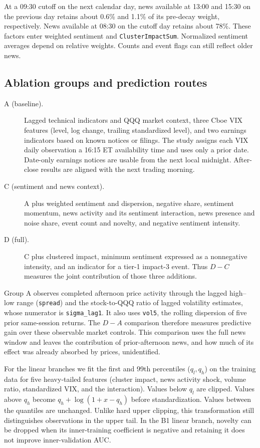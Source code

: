 \documentclass{article}
\begin{document}
At a 09:30 cutoff on the next calendar day, news available at 13:00 and 15:30 on the previous day retains about 0.6\% and 1.1\% of its pre-decay weight, respectively. News available at 08:30 on the cutoff day retains about 78\%. These factors enter weighted sentiment and \texttt{ClusterImpactSum}. Normalized sentiment averages depend on relative weights. Counts and event flags can still reflect older news.

\subsection{Ablation groups and prediction routes}

\begin{description}
 \item[A (baseline).] Lagged technical indicators and QQQ market context, three Cboe VIX features (level, log change, trailing standardized level), and two earnings indicators based on known notices or filings. The study assigns each VIX daily observation a 16:15 ET availability time and uses only a prior date. Date-only earnings notices are usable from the next local midnight. After-close results are aligned with the next trading morning.
 \item[C (sentiment and news context).] A plus weighted sentiment and dispersion, negative share, sentiment momentum, news activity and its sentiment interaction, news presence and noise share, event count and novelty, and negative sentiment intensity.
 \item[D (full).] C plus clustered impact, minimum sentiment expressed as a nonnegative intensity, and an indicator for a tier-1 impact-3 event. Thus $D-C$ measures the joint contribution of those three additions.
\end{description}

Group A observes completed afternoon price activity through the lagged high--low range (\texttt{spread}) and the stock-to-QQQ ratio of lagged volatility estimates, whose numerator is \texttt{sigma\_lag1}. It also uses \texttt{vol5}, the rolling dispersion of five prior same-session returns. The $D-A$ comparison therefore measures predictive gain over these observable market controls. This comparison uses the full news window and leaves the contribution of prior-afternoon news, and how much of its effect was already absorbed by prices, unidentified.

For the linear branches we fit the first and 99th percentiles ($q_l,q_h$) on the training data for five heavy-tailed features (cluster impact, news activity shock, volume ratio, standardized VIX, and the interaction). Values below $q_l$ are clipped. Values above $q_h$ become $q_h+\log(1+x-q_h)$ before standardization. Values between the quantiles are unchanged. Unlike hard upper clipping, this transformation still distinguishes observations in the upper tail. In the B1 linear branch, novelty can be dropped when its inner-training coefficient is negative and retaining it does not improve inner-validation AUC.
\end{document}
